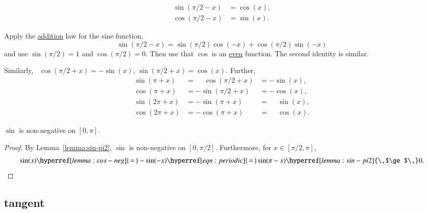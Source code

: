 \begin{lemma}\label{lemma:cos-sin}
    $$
   \begin{array}{rll}
    \sin(\pi/2 - x)  &= \cos(x),\\
     \cos(\pi/2 - x)&=\sin(x).
   \end{array}
    $$
\end{lemma}

\begin{proved}
    Apply the \hyperref[lemma:sin-add]{addition} law for the sine function,
    $$\sin(\pi/2 - x) = \sin(\pi/2)\cos(-x) + \cos(\pi/2)\sin(-x)$$
    and use
    \hyperref[lemma:sin-pi2]{$\sin(\pi/2) = 1$} and \hyperref[eqn:cospi2]{$\cos(\pi/2) = 0$}.  Then use that $\cos$ is
    an \hyperref[lemma:cos-neg]{even} function.  The second identity is similar.
\swallowed\end{proved}

Similarly,~%
%
$\cos(\pi/2 + x) =
-\sin(x)$, $\sin(\pi/2 + x) = \cos(x)$.  Further,
\begin{equation}\label{eqn:periodic}
\begin{array}{lll}
      \sin(\pi + x) &= \phantom{-}\cos(\pi/2 + x) &= -\sin(x),\\
      \cos(\pi + x) &= -\sin(\pi/2 + x) &= -\cos(x),\\
      \sin(2\pi + x) &= -\sin(\pi + x) &= \phantom{-}\sin(x),\\
      \cos(2\pi + x) &= -\cos(\pi + x) &= \phantom{-}\cos(x).
      \end{array}
\end{equation}
%
%

\begin{lemma}\label{lemma:sin-pos}
  $\sin$ is non-negative on $[0,\pi]$.
\end{lemma}

\begin{proof} By Lemma~\ref{lemma:sin-pi2}, $\sin$ is non-negative on $[0,\pi/2]$.
Furthermore, for $x\in[\pi/2,\pi]$,
$$
\sin(x) \hyperref[lemma:cos-neg]{\,=\,} -\sin(-x) 
\hyperref[eqn:periodic]{\,=\,}  \sin(\pi-x) \hyperref[lemma:sin-pi2]{\,$\ge$\,} 0.
$$
\end{proof}



\subsection{tangent}
\label{sec:tangent}

